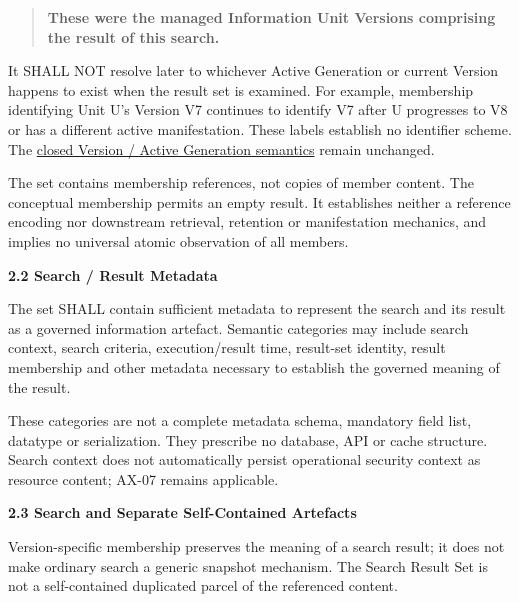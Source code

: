 \begin{quote}


\textbf{These were the managed Information Unit Versions comprising the result
of this search.}



\end{quote}


It SHALL NOT resolve later to whichever Active Generation or current Version
happens to exist when the result set is examined. For example, membership
identifying Unit U's Version V7 continues to identify V7 after U progresses to
V8 or has a different active manifestation. These labels establish no
identifier scheme. The \href{\detokenize{../../../../../../../../docs/markdown/04-information-architecture/metamodel/information-architecture-metamodel.md#651-version-and-active-generation}}{closed Version / Active Generation semantics}
remain unchanged.



The set contains membership references, not copies of member content. The
conceptual \texttt{} membership permits an empty result. It establishes neither
a reference encoding nor downstream retrieval, retention or manifestation
mechanics, and implies no universal atomic observation of all members.



\par\medskip\textbf{2.2 Search / Result Metadata}\par


The set SHALL contain sufficient metadata to represent the search and its
result as a governed information artefact. Semantic categories may include
search context, search criteria, execution/result time, result-set identity,
result membership and other metadata necessary to establish the governed
meaning of the result.



These categories are not a complete metadata schema, mandatory field list,
datatype or serialization. They prescribe no database, API or cache structure.
Search context does not automatically persist operational security context as
resource content; AX-07 remains applicable.



\par\medskip\textbf{2.3 Search and Separate Self-Contained Artefacts}\par


Version-specific membership preserves the meaning of a search result; it does
not make ordinary search a generic snapshot mechanism. The Search Result Set
is not a self-contained duplicated parcel of the referenced content.



